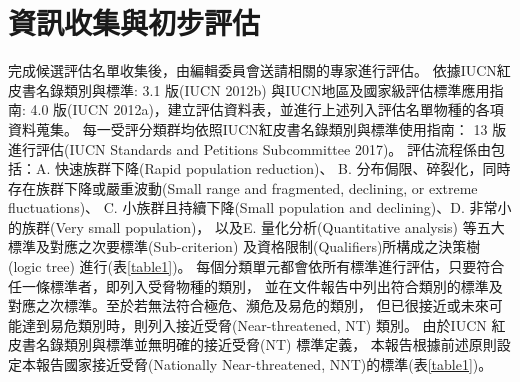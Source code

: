 \section{資訊收集與初步評估}
\begin{multicols}{2}

完成候選評估名單收集後，由編輯委員會送請相關的專家進行評估。
依據IUCN紅皮書名錄類別與標準: 3.1 版(IUCN 2012b) 與IUCN地區及國家級評估標準應用指南:
4.0 版(IUCN 2012a)，建立評估資料表，並進行上述列入評估名單物種的各項資料蒐集。
每一受評分類群均依照IUCN紅皮書名錄類別與標準使用指南：
13 版進行評估(IUCN Standards and Petitions Subcommittee 2017)。
評估流程係由包括：A. 快速族群下降(Rapid population reduction)、
B. 分布侷限、碎裂化，同時存在族群下降或嚴重波動(Small range and fragmented, declining, or extreme fluctuations)、
C. 小族群且持續下降(Small population and declining)、D. 非常小的族群(Very small population)，
以及E. 量化分析(Quantitative analysis) 等五大標準及對應之次要標準(Sub-criterion)
及資格限制(Qualifiers)所構成之決策樹(logic tree) 進行(表\ref{table1})。
每個分類單元都會依所有標準進行評估，只要符合任一條標準者，即列入受脅物種的類別，
並在文件報告中列出符合類別的標準及對應之次標準。至於若無法符合極危、瀕危及易危的類別，
但已很接近或未來可能達到易危類別時，則列入接近受脅(Near-threatened, NT) 類別。
由於IUCN 紅皮書名錄類別與標準並無明確的接近受脅(NT) 標準定義，
本報告根據前述原則設定本報告國家接近受脅(Nationally Near-threatened, NNT)的標準(表\ref{table1})。\\

\end{multicols}
